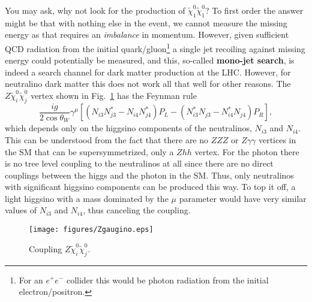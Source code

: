 \documentclass[notes.tex]{subfiles}
\begin{document}
You may ask, why not look for the production of $\tilde{\chi}^0_1\tilde{\chi}^0_1$? To first order the answer might be that with nothing else in the event, we cannot measure the missing energy as that requires an {\it imbalance} in momentum. However, given sufficient QCD radiation from the initial quark/gluon\footnote{For an $e^+e^-$ collider this would be photon radiation from the initial electron/positron.} a single jet recoiling against missing energy could potentially be measured, and this, so-called {\bf mono-jet search}, is indeed a search channel for dark matter production at the LHC. However, for neutralino dark matter this does not work all that well for other reasons. The $Z\tilde\chi_i^0\tilde\chi_j^0$ vertex shown in Fig.~\ref{fig:ZNN}  has the Feynman rule 
\begin{equation}
\frac{ig}{2\cos\theta_W}\gamma^\mu\left[\left(N_{i3}N^*_{j3}-N_{i4}N^*_{j4}\right)P_L-\left(N^*_{i3}N_{j3}-N^*_{i4}N_{j4}\right)P_R\right],
\end{equation}
which depends only on the higgsino components of the neutralinos, $N_{i3}$ and $N_{i4}$. This can be understood from the fact that there are no $ZZZ$ or $Z\gamma\gamma$ vertices in the SM that can be supersymmetrized, only a $Zhh$ vertex. For the photon there is no tree level coupling to the neutralinos at all since there are no direct couplings between the higgs and the photon in the SM. Thus, only neutralinos with significant higgsino components can be produced this way. To top it off, a light higgsino with a mass dominated by the $\mu$ parameter would have very similar values of $N_{i3}$ and $N_{i4}$, thus canceling the coupling.

\begin{figure}[h!]
\begin{center}
\texttt{[image: figures/Zgaugino.eps]} 
\caption{Coupling $Z\tilde\chi_i^0\tilde\chi_j^0$.\label{fig:ZNN}}
\end{center}
\end{figure}
\end{document}
